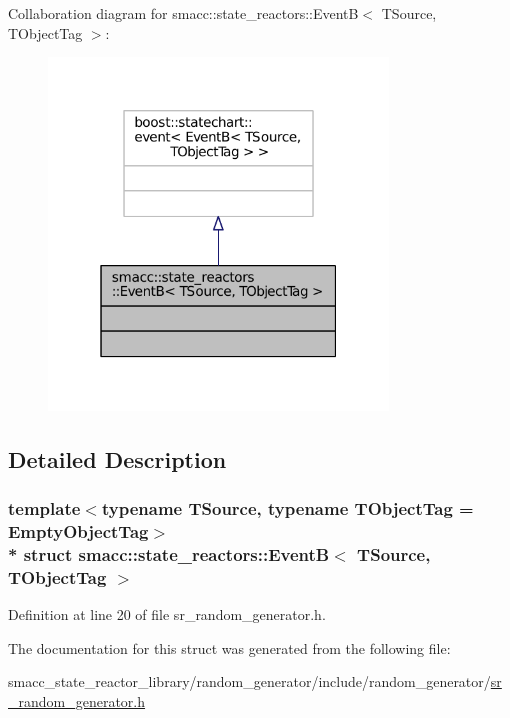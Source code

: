 Collaboration diagram for smacc\+:\+:state\+\_\+reactors\+:\+:EventB$<$ T\+Source, T\+Object\+Tag $>$\+:
\nopagebreak
\begin{figure}[H]
\begin{center}
\leavevmode
\includegraphics[width=256pt]{structsmacc_1_1state__reactors_1_1EventB__coll__graph}
\end{center}
\end{figure}


\subsection{Detailed Description}
\subsubsection*{template$<$typename T\+Source, typename T\+Object\+Tag = Empty\+Object\+Tag$>$\\*
struct smacc\+::state\+\_\+reactors\+::\+Event\+B$<$ T\+Source, T\+Object\+Tag $>$}



Definition at line 20 of file sr\+\_\+random\+\_\+generator.\+h.



The documentation for this struct was generated from the following file\+:\begin{DoxyCompactItemize}
\item 
smacc\+\_\+state\+\_\+reactor\+\_\+library/random\+\_\+generator/include/random\+\_\+generator/\hyperlink{sr__random__generator_8h}{sr\+\_\+random\+\_\+generator.\+h}\end{DoxyCompactItemize}
